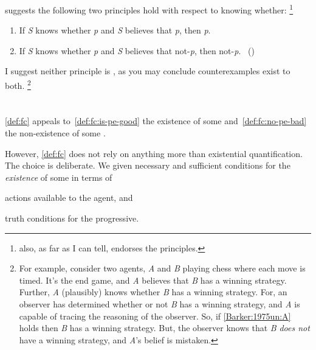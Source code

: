 \begin{note}
  \begin{illustration}
    \citeauthor{Barker:1975un} suggests the following two principles hold with respect to knowing whether:%
  \footnote{
    \citeauthor{Barker:1975un} also, as far as I can tell, endorses the principles.
  }
    \begin{enumerate}[label=(\Alph*), ref=(\Alph*), noitemsep]
    \item
      \label{Barker:1975un:A}
      If \emph{S} knows whether \emph{p} and \emph{S} believes that \emph{p}, then \emph{p}.
    \item
      \label{Barker:1975un:B}
      If \emph{S} knows whether \emph{p} and \emph{S} believes that not-\emph{p}, then not-\emph{p}.\newline
      \mbox{ }\hfill\mbox{(\citeyear[281]{Barker:1975un})}
    \end{enumerate}
  \end{illustration}
  I suggest neither principle is \fc{}, as you may conclude counterexamples exist to both.%
  \footnote{
    For example, consider two agents, \emph{A} and \emph{B} playing chess where each move is timed.
  It's the end game, and \emph{A} believes that \emph{B} has a winning strategy.
  Further, \emph{A} (plausibly) knows whether \emph{B} has a winning strategy.
  For, an observer has determined whether or not \emph{B} has a winning strategy, and \emph{A} is capable of tracing the reasoning of the observer.
  So, if \ref{Barker:1975un:A} holds then \emph{B} has a winning strategy.
  But, the observer knows that \emph{B} \emph{does not} have a winning strategy, and \emph{A}'s belief is mistaken.
  }
\end{note}


\section{}
\label{cha:sec:fcs-def:potential-events}

\begin{note}
  \autoref{def:fc} appeals to~\ref{def:fc:is-pe-good} the existence of some \pevent{} and~\ref{def:fc:no-pe-bad} the non-existence of some \pevent{}.

  However, \autoref{def:fc} does not rely on anything more than existential quantification.
  The choice is deliberate.
  We given necessary and sufficient conditions for the \emph{existence} of some \pevent{} in terms of
  \begin{enumerate*}[label=(\roman*)]
  \item
    actions available to the agent, and
  \item
    truth conditions for the progressive.
  \end{enumerate*}
\end{note}

